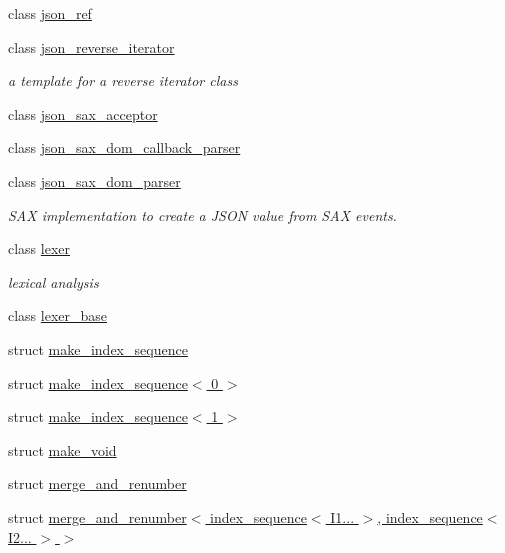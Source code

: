 \begin{DoxyCompactItemize}
\item 
class \hyperlink{classnlohmann_1_1detail_1_1json__ref}{json\+\_\+ref}
\item 
class \hyperlink{classnlohmann_1_1detail_1_1json__reverse__iterator}{json\+\_\+reverse\+\_\+iterator}
\begin{DoxyCompactList}\small\item\em a template for a reverse iterator class \end{DoxyCompactList}\item 
class \hyperlink{classnlohmann_1_1detail_1_1json__sax__acceptor}{json\+\_\+sax\+\_\+acceptor}
\item 
class \hyperlink{classnlohmann_1_1detail_1_1json__sax__dom__callback__parser}{json\+\_\+sax\+\_\+dom\+\_\+callback\+\_\+parser}
\item 
class \hyperlink{classnlohmann_1_1detail_1_1json__sax__dom__parser}{json\+\_\+sax\+\_\+dom\+\_\+parser}
\begin{DoxyCompactList}\small\item\em S\+AX implementation to create a J\+S\+ON value from S\+AX events. \end{DoxyCompactList}\item 
class \hyperlink{classnlohmann_1_1detail_1_1lexer}{lexer}
\begin{DoxyCompactList}\small\item\em lexical analysis \end{DoxyCompactList}\item 
class \hyperlink{classnlohmann_1_1detail_1_1lexer__base}{lexer\+\_\+base}
\item 
struct \hyperlink{structnlohmann_1_1detail_1_1make__index__sequence}{make\+\_\+index\+\_\+sequence}
\item 
struct \hyperlink{structnlohmann_1_1detail_1_1make__index__sequence_3_010_01_4}{make\+\_\+index\+\_\+sequence$<$ 0 $>$}
\item 
struct \hyperlink{structnlohmann_1_1detail_1_1make__index__sequence_3_011_01_4}{make\+\_\+index\+\_\+sequence$<$ 1 $>$}
\item 
struct \hyperlink{structnlohmann_1_1detail_1_1make__void}{make\+\_\+void}
\item 
struct \hyperlink{structnlohmann_1_1detail_1_1merge__and__renumber}{merge\+\_\+and\+\_\+renumber}
\item 
struct \hyperlink{structnlohmann_1_1detail_1_1merge__and__renumber_3_01index__sequence_3_01I1_8_8_8_01_4_00_01inde4885d6f1d93a04f25932afbd429c4793}{merge\+\_\+and\+\_\+renumber$<$ index\+\_\+sequence$<$ I1... $>$, index\+\_\+sequence$<$ I2... $>$ $>$}

\end{DoxyCompactItemize}
